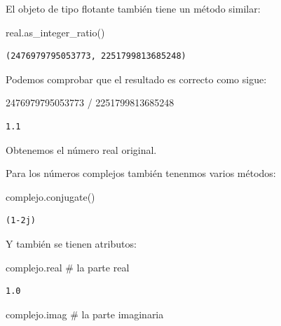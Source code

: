 \documentclass[
  spanish,
  letterpaper,
]{scrbook}
\newenvironment{Shaded}{\begin{snugshade}}{\end{snugshade}}
\newcommand{\CommentTok}[1]{\textcolor[rgb]{0.37,0.37,0.37}{#1}}
\newcommand{\DecValTok}[1]{\textcolor[rgb]{0.68,0.00,0.00}{#1}}
\newcommand{\NormalTok}[1]{\textcolor[rgb]{0.00,0.23,0.31}{#1}}
\newcommand{\OperatorTok}[1]{\textcolor[rgb]{0.37,0.37,0.37}{#1}}
\theoremstyle{definition}
\theoremstyle{remark}
\begin{document}
El objeto de tipo flotante también tiene un método similar:

\begin{Shaded}
\begin{Highlighting}[]
\NormalTok{real.as\_integer\_ratio()}
\end{Highlighting}
\end{Shaded}

\begin{verbatim}
(2476979795053773, 2251799813685248)
\end{verbatim}

Podemos comprobar que el resultado es correcto como sigue:

\begin{Shaded}
\begin{Highlighting}[]
\DecValTok{2476979795053773} \OperatorTok{/} \DecValTok{2251799813685248}
\end{Highlighting}
\end{Shaded}

\begin{verbatim}
1.1
\end{verbatim}

Obtenemos el número real original.

Para los números complejos también tenenmos varios métodos:

\begin{Shaded}
\begin{Highlighting}[]
\NormalTok{complejo.conjugate()}
\end{Highlighting}
\end{Shaded}

\begin{verbatim}
(1-2j)
\end{verbatim}

Y también se tienen atributos:

\begin{Shaded}
\begin{Highlighting}[]
\NormalTok{complejo.real }\CommentTok{\# la parte real}
\end{Highlighting}
\end{Shaded}

\begin{verbatim}
1.0
\end{verbatim}

\begin{Shaded}
\begin{Highlighting}[]
\NormalTok{complejo.imag }\CommentTok{\# la parte imaginaria}
\end{Highlighting}
\end{Shaded}
\end{document}

